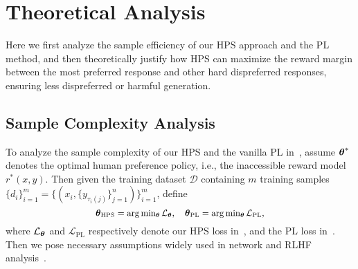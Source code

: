 \section{Theoretical Analysis}
\label{sec:theory}
Here we first analyze the sample efficiency of our  HPS approach and the PL method, and then   theoretically justify how HPS  can maximize the reward margin between  the most preferred response and other hard dispreferred responses, ensuring less  dispreferred or harmful generation.
\vspace{-3.5pt}
\subsection{Sample Complexity Analysis}
\vspace{-1pt}
To analyze the sample complexity of our  HPS  and the vanilla PL in~,  assume $\boldsymbol{\theta}^{*}$ denotes the optimal human preference policy, i.e.,  the inaccessible reward model $r^*(x, y)$. Then  given  the  training dataset $\mathcal{D}$  containing $m$ training samples $\{d_{i}\}_{i=1}^m\!=\!\{(x_{i}, \{y_{\tau_{i}{(j)}}\}_{j=1}^n)\}_{i=1}^m$,  define 
\vspace{-3.5pt}
\begin{equation}
\vspace{-5pt}
	\fontsize{9}{3}\selectfont{
		\begin{aligned}
			\label{eq:PLasfdas}
 	\wmi{HPS}=\arg\min\nolimits_{\wm} \mathcal{L}_{\wm}, \quad 	\wmi{PL}=\arg\min\nolimits_{\wm} \mathcal{L}_{\text{PL}},
	\end{aligned}}
\end{equation}
where $\mathcal{L}_{{\boldsymbol{\theta}}}$ and $\mathcal{L}_{\text{PL}}$   respectively denote  our  HPS  loss in~, and the PL  loss in~.  Then we pose necessary assumptions widely used in network and RLHF analysis~\cite{principled, li2024policy, ozay2019fine}. 

